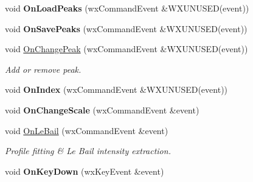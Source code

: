 \begin{DoxyCompactItemize}
void {\bfseries On\+Load\+Peaks} (wx\+Command\+Event \&W\+X\+U\+N\+U\+S\+ED(event))
\item 
\mbox{\label{class_obj_cryst_1_1_w_x_powder_pattern_graph_adec77e69c18a7db9b6f72ae3d5b5a5d3}} 
void {\bfseries On\+Save\+Peaks} (wx\+Command\+Event \&W\+X\+U\+N\+U\+S\+ED(event))
\item 
\mbox{\label{class_obj_cryst_1_1_w_x_powder_pattern_graph_a5d57b3210273cd01e39294b92e09288e}} 
void \mbox{\hyperlink{class_obj_cryst_1_1_w_x_powder_pattern_graph_a5d57b3210273cd01e39294b92e09288e}{On\+Change\+Peak}} (wx\+Command\+Event \&W\+X\+U\+N\+U\+S\+ED(event))
\begin{DoxyCompactList}\small\item\em Add or remove peak. \end{DoxyCompactList}\item 
\mbox{\label{class_obj_cryst_1_1_w_x_powder_pattern_graph_ad23e59a23f5fcd0fc0969bbbed88505d}} 
void {\bfseries On\+Index} (wx\+Command\+Event \&W\+X\+U\+N\+U\+S\+ED(event))
\item 
\mbox{\label{class_obj_cryst_1_1_w_x_powder_pattern_graph_a7519dff1a7d09067ea54ccbef94a6f49}} 
void {\bfseries On\+Change\+Scale} (wx\+Command\+Event \&event)
\item 
\mbox{\label{class_obj_cryst_1_1_w_x_powder_pattern_graph_a909ce5f24733f476ab284a0e90920896}} 
void \mbox{\hyperlink{class_obj_cryst_1_1_w_x_powder_pattern_graph_a909ce5f24733f476ab284a0e90920896}{On\+Le\+Bail}} (wx\+Command\+Event \&event)
\begin{DoxyCompactList}\small\item\em Profile fitting \& Le Bail intensity extraction. \end{DoxyCompactList}\item 
\mbox{\label{class_obj_cryst_1_1_w_x_powder_pattern_graph_a98a2e3ca8c8056219a1e038b4ba4e82e}} 
void {\bfseries On\+Key\+Down} (wx\+Key\+Event \&event)
\item 
\mbox{\label{class_obj_cryst_1_1_w_x_powder_pattern_graph_a81db7a517c4b47bed982eb714ca0cc32}} 

\end{DoxyCompactItemize}

